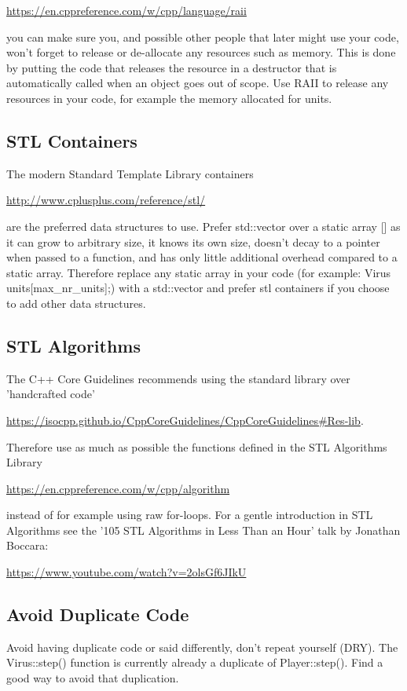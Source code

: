 \documentclass[12pt]{article}
\begin{document}
\url{https://en.cppreference.com/w/cpp/language/raii}

you can make sure you, and possible other people that later might use
your code, won't forget to release or de-allocate any resources such
as memory. This is done by putting the code that releases the resource
in a destructor that is automatically called when an object goes out
of scope. Use RAII to release any resources in your code, for example
the memory allocated for units.

\subsection{STL Containers}
The modern Standard Template Library containers

\url{http://www.cplusplus.com/reference/stl/}

are the preferred data structures to use. Prefer std::vector over a
static array [] as it can grow to arbitrary size, it knows its own
size, doesn't decay to a pointer when passed to a function, and has
only little additional overhead compared to a static array. Therefore
replace any static array in your code (for example: Virus
units[max\_nr\_units];) with a std::vector and prefer stl containers
if you choose to add other data structures.

\subsection{STL Algorithms}
The C++ Core Guidelines recommends using the standard library over
'handcrafted code'

\url{https://isocpp.github.io/CppCoreGuidelines/CppCoreGuidelines#Res-lib}.

Therefore use as much as possible the functions defined in the STL
Algorithms Library

\url{https://en.cppreference.com/w/cpp/algorithm}

instead of for example using raw for-loops. For a gentle introduction
in STL Algorithms see the '105 STL Algorithms in Less Than an Hour'
talk by Jonathan Boccara:

\url{https://www.youtube.com/watch?v=2olsGf6JIkU}

\subsection{Avoid Duplicate Code}
Avoid having duplicate code or said differently, don't repeat yourself
(DRY). The Virus::step() function is currently already a duplicate of
Player::step(). Find a good way to avoid that duplication.
\end{document}
